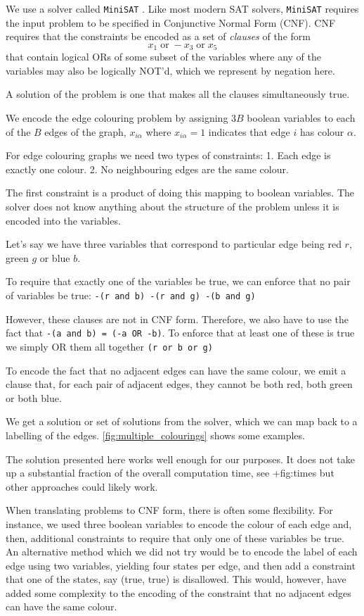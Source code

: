 We use a solver called \texttt{MiniSAT} \autocite{imms-sat18}. Like most modern SAT solvers, \texttt{MiniSAT} requires the input problem to be specified in Conjunctive Normal Form (CNF). CNF requires that the constraints be encoded as a set of \emph{clauses} of the form \[x_1 \;\textrm{or}\; -x_3 \;\textrm{or}\; x_5\] that contain logical ORs of some subset of the variables where any of the variables may also be logically NOT'd, which we represent by negation here.

A solution of the problem is one that makes all the clauses simultaneously true.

We encode the edge colouring problem by assigning \(3B\) boolean variables to each of the \(B\) edges of the graph, \(x_{i\alpha}\) where \(x_{i\alpha} = 1\) indicates that edge \(i\) has colour \(\alpha\).

For edge colouring graphs we need two types of constraints: 1. Each edge is exactly one colour. 2. No neighbouring edges are the same colour.

The first constraint is a product of doing this mapping to boolean variables. The solver does not know anything about the structure of the problem unless it is encoded into the variables.

Let's say we have three variables that correspond to particular edge being red \(r\), green \(g\) or blue \(b\).

To require that exactly one of the variables be true, we can enforce that no pair of variables be true: \texttt{-(r\ and\ b)\ -(r\ and\ g)\ -(b\ and\ g)}

However, these clauses are not in CNF form. Therefore, we also have to use the fact that \texttt{-(a\ and\ b)\ =\ (-a\ OR\ -b)}. To enforce that at least one of these is true we simply OR them all together \texttt{(r\ or\ b\ or\ g)}

To encode the fact that no adjacent edges can have the same colour, we emit a clause that, for each pair of adjacent edges, they cannot be both red, both green or both blue.

We get a solution or set of solutions from the solver, which we can map back to a labelling of the edges. \cref{fig:multiple_colourings} shows some examples.

The solution presented here works well enough for our purposes. It does not take up a substantial fraction of the overall computation time, see +fig:times but other approaches could likely work.

When translating problems to CNF form, there is often some flexibility. For instance, we used three boolean variables to encode the colour of each edge and, then, additional constraints to require that only one of these variables be true. An alternative method which we did not try would be to encode the label of each edge using two variables, yielding four states per edge, and then add a constraint that one of the states, say (true, true) is disallowed. This would, however, have added some complexity to the encoding of the constraint that no adjacent edges can have the same colour.

